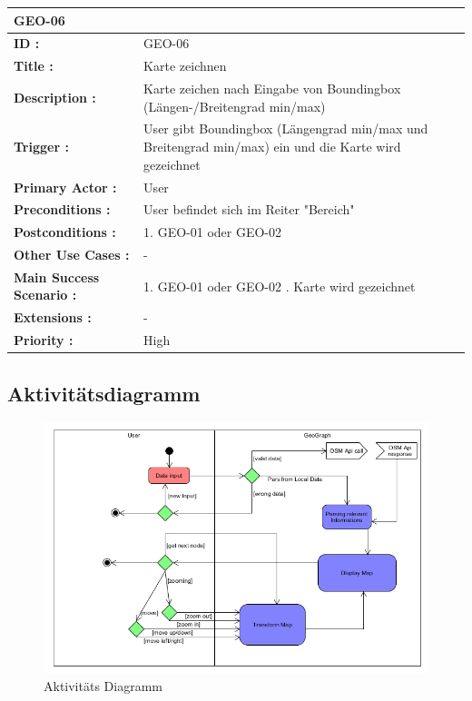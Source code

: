 	\begin{table}[H]
		\begin{tabular}{|p{8cm}|p{8cm}|}
			\hline
			\textbf{GEO-06 } \\ 
			\hline
			\textbf{ID :}\centering & GEO-06  \\ \hline 
			\textbf{Title :}\centering & Karte zeichnen \\ \hline 
			\textbf{Description :}\centering & Karte zeichen nach Eingabe von Boundingbox (Längen-/Breitengrad min/max) \\ \hline 
			\textbf{Trigger :}\centering & User gibt Boundingbox (Längengrad min/max und Breitengrad min/max) ein und die Karte wird gezeichnet \\ \hline 
			\textbf{Primary Actor :} \centering & User \\ \hline 
			\textbf{Preconditions :}\centering & User befindet sich im Reiter "Bereich" \\ \hline 
			\textbf{Postconditions :}\centering	& 
			1. GEO-01 oder GEO-02 \\ \hline		
			\textbf{Other Use Cases :}\centering & - \\ \hline  
			\textbf{Main Success Scenario :}\centering &
			1. GEO-01 oder GEO-02 \newline
			2. Karte wird gezeichnet \\ \hline  
			\textbf{Extensions :}\centering & - \\ \hline  
			\textbf{Priority :}\centering & High \\ \hline  
		\end{tabular}
	\end{table}			
	
	\subsection{Aktivitätsdiagramm}
		\begin{figure}[H]
			\centering
			\includegraphics[width=0.7\linewidth]{images/Ablauf}
			\caption{Aktivitäts Diagramm}
			\label{fig:Aktivitäts Diagramm}
		\end{figure}

